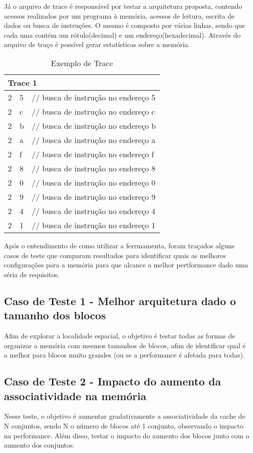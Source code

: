 \documentclass[conference]{IEEEtran}
\begin{document}
Já o arquivo de trace é responsável por testar a arquitetura proposta, contendo acessos realizados por um programa à memória, acessos de leitura, escrita de dados ou busca de instruções. O mesmo é composto por várias linhas, sendo que cada uma contém um rótulo(decimal) e um endereço(hexadecimal). Através do arquivo de traço é possível gerar estatísticas sobre a memória.

\begin{table}[h!]
\centering
\begin{tabular}{lll}
\hline
\multicolumn{3}{l}{\textbf{Trace 1}} \\ \hline
2 & 5 & // busca de instrução no endereço 5 \\ 
2 & c & // busca de instrução no endereço c \\ 
2 & b & // busca de instrução no endereço b \\ 
2 & a & // busca de instrução no endereço a \\ 
2 & f & // busca de instrução no endereço f \\ 
2 & 8 & // busca de instrução no endereço 8 \\ 
2 & 0 & // busca de instrução no endereço 0 \\ 
2 & 9 & // busca de instrução no endereço 9 \\ 
2 & 4 & // busca de instrução no endereço 4 \\ 
2 & 1 & // busca de instrução no endereço 1 \\ \hline
\end{tabular}
\caption{Exemplo de Trace}
\label{tab:traceAleatorio}
\end{table}

Após o entendimento de como utilizar a ferrmamenta, foram traçados alguns casos de teste que comparam resultados para identificar quais as melhores configurações para a memória para que alcance a melhor pertformance dado uma séria de requisitos.

\subsection{Caso de Teste 1 - Melhor arquitetura dado o tamanho dos blocos}
Afim de explorar a localidade espacial, o objetivo é testar todas as formas de organizar a memória com mesmos tamanhos de blocos, afim de identificar qual é a melhor para blocos muito grandes (ou se a performance é afetada para todas).

\subsection{Caso de Teste 2 - Impacto do aumento da associatividade na memória}
Nesse teste, o objetivo é aumentar gradativamente a associatividade da cache de N conjuntos, sendo N o número de blocos até 1 conjunto, observando o impacto na performance. Além disso, testar o impacto do aumento dos blocos junto com o aumento dos conjuntos.
\end{document}
